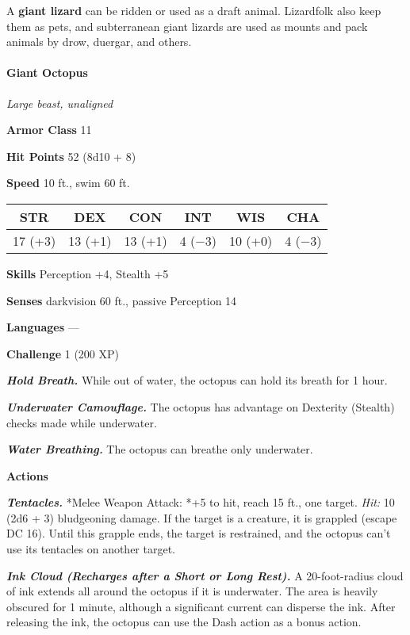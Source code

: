 \documentclass[
]{article}
\begin{document}
A \textbf{giant lizard} can be ridden or used as a draft animal.
Lizardfolk also keep them as pets, and subterranean giant lizards are
used as mounts and pack animals by drow, duergar, and others.

\hypertarget{giant-octopus}{%
\paragraph{Giant Octopus}\label{giant-octopus}}

\emph{Large beast, unaligned}

\textbf{Armor Class} 11

\textbf{Hit Points} 52 (8d10 + 8)

\textbf{Speed} 10 ft., swim 60 ft.

\begin{longtable}[]{@{}cccccc@{}}
\toprule
STR & DEX & CON & INT & WIS & CHA\tabularnewline
\midrule
\endhead
17 (+3) & 13 (+1) & 13 (+1) & 4 (−3) & 10 (+0) & 4 (−3)\tabularnewline
\bottomrule
\end{longtable}

\textbf{Skills} Perception +4, Stealth +5

\textbf{Senses} darkvision 60 ft., passive Perception 14

\textbf{Languages} ---

\textbf{Challenge} 1 (200 XP)

\emph{\textbf{Hold Breath.}} While out of water, the octopus can hold
its breath for 1 hour.

\emph{\textbf{Underwater Camouflage.}} The octopus has advantage on
Dexterity (Stealth) checks made while underwater.

\emph{\textbf{Water Breathing.}} The octopus can breathe only
underwater.

\textbf{Actions}

\emph{\textbf{Tentacles.}} *Melee Weapon Attack: *+5 to hit, reach 15
ft., one target. \emph{Hit:} 10 (2d6 + 3) bludgeoning damage. If the
target is a creature, it is grappled (escape DC 16). Until this grapple
ends, the target is restrained, and the octopus can't use its tentacles
on another target.

\emph{\textbf{Ink Cloud (Recharges after a Short or Long Rest).}} A
20-foot-radius cloud of ink extends all around the octopus if it is
underwater. The area is heavily obscured for 1 minute, although a
significant current can disperse the ink. After releasing the ink, the
octopus can use the Dash action as a bonus action.
\end{document}
